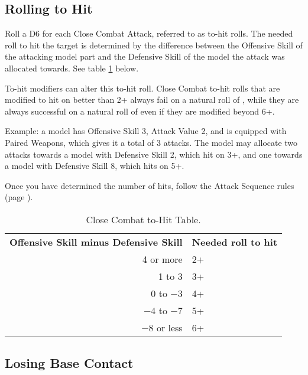 \subsection{Rolling to Hit}
\label{rolling_to_hit}

Roll a D6 for each Close Combat Attack, referred to as to-hit rolls. The needed roll to hit the target is determined by the difference between the Offensive Skill of the attacking model part and the Defensive Skill of the model the attack was allocated towards. See table \ref{table/close_combat_to_hit_table} below.
\par
{}To-hit modifiers can alter this to-hit roll. Close Combat to-hit rolls that are modified to hit on better than 2+ always fail on a natural roll of , while they are always successful on a natural roll of  even if they are modified beyond 6+.
\par
Example: a model has Offensive Skill 3, Attack Value 2, and is equipped with Paired Weapons, which gives it a total of 3 attacks. The model may allocate two attacks towards a model with Defensive Skill 2, which hit on 3+, and one towards a model with Defensive Skill 8, which hits on 5+.

Once you have determined the number of hits, follow the Attack Sequence rules (page \pageref{attack_sequence}).

\begin{table}[!htbp]
\centering
{}\begin{tabular}{r l}
  \hline
  \textbf{Offensive Skill minus Defensive Skill} & \textbf{Needed roll to hit}\\
  4 or more & 2+ \\
  1 to 3 & 3+ \\
  0 to −3 & 4+\\
  −4 to −7 & 5+\\
  −8 or less & 6+\\
  \hline
\end{tabular}
\caption{Close Combat to-Hit Table.}
\label{table/close_combat_to_hit_table}
\end{table}

\subsection{Losing Base Contact}
\label{losing_base_contact}

